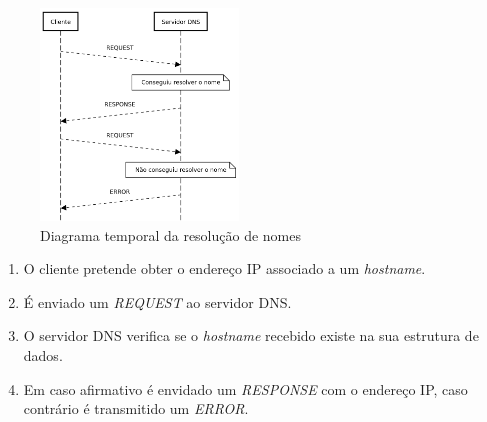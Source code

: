     \begin{figure}
        \centering
        \includegraphics[width=0.47\textwidth]{Imagens/Diagramas Temporais/dns.png}
        \caption{Diagrama temporal da resolução de nomes}
    \end{figure}

    \begin{enumerate}
        
        \item O cliente pretende obter o endereço IP associado a um \textit{hostname}.

        \item É enviado um \textit{REQUEST} ao servidor DNS.

        \item O servidor DNS verifica se o \textit{hostname} recebido existe na sua estrutura de dados.

        \item Em caso afirmativo é envidado um \textit{RESPONSE} com o endereço IP, caso contrário é transmitido um \textit{ERROR}.

    \end{enumerate}
